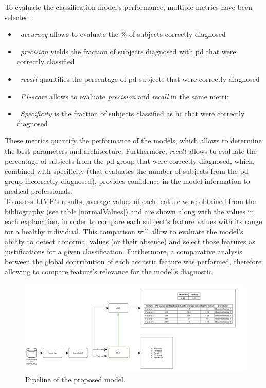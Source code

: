 To evaluate the classification model's performance, multiple metrics have been selected:

\begin{itemize}
	\item ~\textit{accuracy} allows to evaluate the \% of subjects correctly diagnosed
	\item ~\textit{precision}  yields the fraction of subjects diagnosed with \gls{pd} that were correctly classified
	\item ~\textit{recall} quantifies the percentage of \gls{pd} subjects that were correctly diagnosed
	\item ~\textit{F1-score} allows to evaluate \textit{precision} and \textit{recall} in the same metric
	\item ~\textit{Specificity} is the fraction of subjects classified as \gls{hc} that were correctly diagnosed
\end{itemize}

These metrics quantify the performance of the models, which allows to determine the best parameters and architecture. Furthermore, \textit{recall} allows to evaluate the percentage of subjects from the \gls{pd} group that were correctly diagnosed, which, combined with specificity (that evaluates the number of subjects from the \gls{pd} group incorrectly diagnosed), provides confidence in the model information to medical professionals.
\\
To assess LIME's results, average values of each feature were obtained from the bibliography (see table \ref{normalValues}) and are shown along with the values in each explanation, in order to compare each subject's feature values with its range for a healthy individual. This comparison will allow to evaluate the model's ability to detect abnormal values (or their absence) and select those features as justifications for a given classification. Furthermore, a comparative analysis between the global contribution of each acoustic feature was performed, therefore allowing to compare feature's relevance for the model's diagnostic.

\begin{figure}[t]
	\begin{center}
		\includegraphics[clip=true, width=\textwidth]{figs/pipeline.png}
	\end{center}
	\caption{Pipeline of the proposed model.}
	\label{pipeline}
\end{figure}

\pagebreak